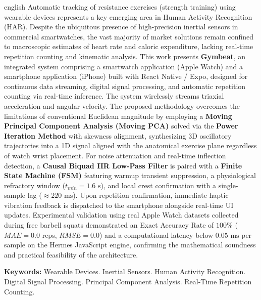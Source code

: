 \documentclass[12pt,openany,oneside,a4paper,english,brazil]{abntex2}
\begin{document}
\begin{resumo}[Abstract]
\begin{otherlanguage*}{english}
Automatic tracking of resistance exercises (strength training) using wearable devices represents a key emerging area in Human Activity Recognition (HAR). Despite the ubiquitous presence of high-precision inertial sensors in commercial smartwatches, the vast majority of market solutions remain confined to macroscopic estimates of heart rate and caloric expenditure, lacking real-time repetition counting and kinematic analysis. This work presents \textbf{Gymbeat}, an integrated system comprising a smartwatch application (Apple Watch) and a smartphone application (iPhone) built with React Native / Expo, designed for continuous data streaming, digital signal processing, and automatic repetition counting via real-time inference. The system wirelessly streams triaxial acceleration and angular velocity. The proposed methodology overcomes the limitations of conventional Euclidean magnitude by employing a \textbf{Moving Principal Component Analysis (Moving PCA)} solved via the \textbf{Power Iteration Method} with skewness alignment, synthesizing 3D oscillatory trajectories into a 1D signal aligned with the anatomical exercise plane regardless of watch wrist placement. For noise attenuation and real-time inflection detection, a \textbf{Causal Biquad IIR Low-Pass Filter} is paired with a \textbf{Finite State Machine (FSM)} featuring warmup transient suppression, a physiological refractory window ($t_{min} = 1.6\text{ s}$), and local crest confirmation with a single-sample lag ($\approx 220\text{ ms}$). Upon repetition confirmation, immediate haptic vibration feedback is dispatched to the smartphone alongside real-time UI updates. Experimental validation using real Apple Watch datasets collected during free barbell squats demonstrated an Exact Accuracy Rate of $100\%$ ($MAE = 0.0$ reps, $RMSE = 0.0$) and a computational latency below $0.05\text{ ms}$ per sample on the Hermes JavaScript engine, confirming the mathematical soundness and practical feasibility of the architecture.

\textbf{Keywords:} Wearable Devices. Inertial Sensors. Human Activity Recognition. Digital Signal Processing. Principal Component Analysis. Real-Time Repetition Counting.
\end{otherlanguage*}
\end{resumo}
\end{document}
